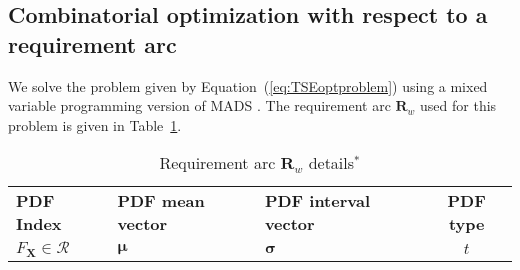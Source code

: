 \subsection{Combinatorial optimization with respect to a requirement arc} \label{subsec:exampleoptprob}

We solve the problem given by Equation~(\ref{eq:TSEoptproblem}) using a mixed variable programming version of \ac{MADS} \cite{Abramson2009}. The requirement arc $\mathbf{R}_w$ used for this problem is given in Table~\ref{table:requirementarcex}.

\begin{table}[h!]
	\centering
	\renewcommand{\arraystretch}{1.0}%
	\footnotesize\addtolength{\tabcolsep}{-5pt}
	\caption{Requirement arc $\mathbf{R}_w$ details$^*$}
	\label{table:requirementarcex}
	\begin{tabular}{l>{\centering\arraybackslash}p{4.2cm}>{\centering\arraybackslash}p{6cm}c}
	\hline\hline

	\bf \ac{PDF} Index & \bf \ac{PDF} mean vector & \bf \ac{PDF} interval vector & \bf \ac{PDF} type \\
	$F_\mathbf{X} \in \mathcal{R}$ &$\boldsymbol{\mu}$ & $\boldsymbol{\sigma}$ & $t$ \\ \hline


\end{tabular}
\end{table}
